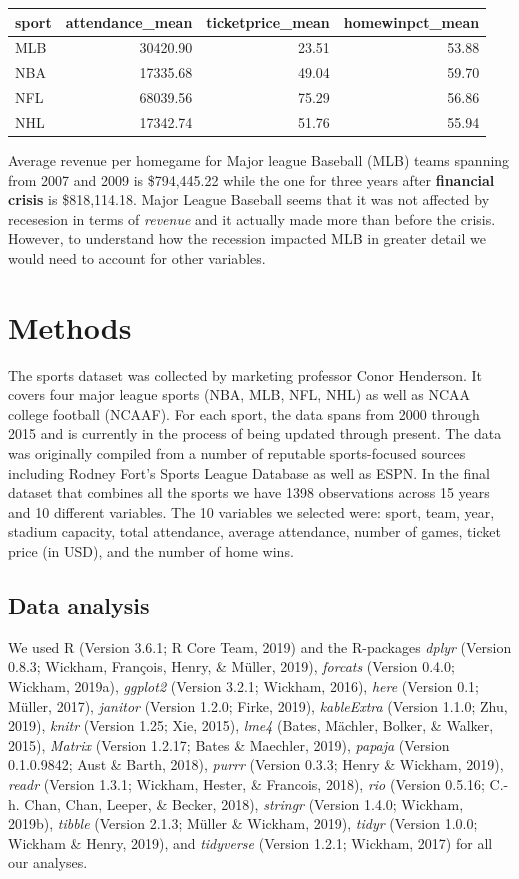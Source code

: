 \documentclass[man, fleqn, noextraspace,floatsintext]{apa6}
\begin{document}
\begin{tabular}{l|r|r|r}
\hline
sport & attendance\_mean & ticketprice\_mean & homewinpct\_mean\\
\hline
MLB & 30420.90 & 23.51 & 53.88\\
\hline
NBA & 17335.68 & 49.04 & 59.70\\
\hline
NFL & 68039.56 & 75.29 & 56.86\\
\hline
NHL & 17342.74 & 51.76 & 55.94\\
\hline
\end{tabular}

Average revenue per homegame for Major league Baseball (MLB) teams
spanning from 2007 and 2009 is \$794,445.22 while the one for three
years after \textbf{financial crisis} is \$818,114.18. Major League
Baseball seems that it was not affected by recesesion in terms of
\emph{revenue} and it actually made more than before the crisis.
However, to understand how the recession impacted MLB in greater detail
we would need to account for other variables.

\section{Methods}\label{methods}

The sports dataset was collected by marketing professor Conor Henderson.
It covers four major league sports (NBA, MLB, NFL, NHL) as well as NCAA
college football (NCAAF). For each sport, the data spans from 2000
through 2015 and is currently in the process of being updated through
present. The data was originally compiled from a number of reputable
sports-focused sources including Rodney Fort's Sports League Database as
well as ESPN. In the final dataset that combines all the sports we have
1398 observations across 15 years and 10 different variables. The 10
variables we selected were: sport, team, year, stadium capacity, total
attendance, average attendance, number of games, ticket price (in USD),
and the number of home wins.

\subsection{Data analysis}\label{data-analysis}

We used R (Version 3.6.1; R Core Team, 2019) and the R-packages
\emph{dplyr} (Version 0.8.3; Wickham, François, Henry, \& Müller, 2019),
\emph{forcats} (Version 0.4.0; Wickham, 2019a), \emph{ggplot2} (Version
3.2.1; Wickham, 2016), \emph{here} (Version 0.1; Müller, 2017),
\emph{janitor} (Version 1.2.0; Firke, 2019), \emph{kableExtra} (Version
1.1.0; Zhu, 2019), \emph{knitr} (Version 1.25; Xie, 2015), \emph{lme4}
(Bates, Mächler, Bolker, \& Walker, 2015), \emph{Matrix} (Version
1.2.17; Bates \& Maechler, 2019), \emph{papaja} (Version 0.1.0.9842;
Aust \& Barth, 2018), \emph{purrr} (Version 0.3.3; Henry \& Wickham,
2019), \emph{readr} (Version 1.3.1; Wickham, Hester, \& Francois, 2018),
\emph{rio} (Version 0.5.16; C.-h. Chan, Chan, Leeper, \& Becker, 2018),
\emph{stringr} (Version 1.4.0; Wickham, 2019b), \emph{tibble} (Version
2.1.3; Müller \& Wickham, 2019), \emph{tidyr} (Version 1.0.0; Wickham \&
Henry, 2019), and \emph{tidyverse} (Version 1.2.1; Wickham, 2017) for
all our analyses.
\end{document}
